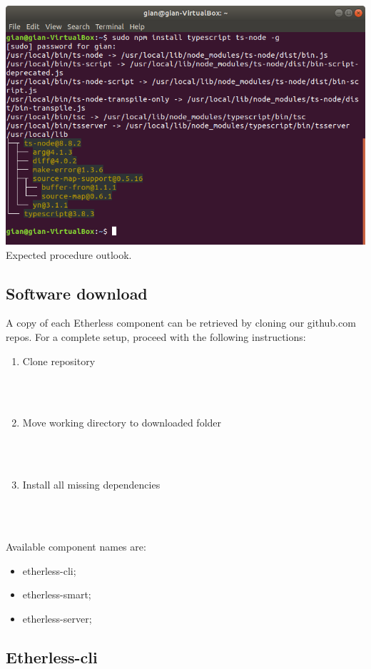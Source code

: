 \includegraphics[width=\textwidth]{res/img/typescriptInstall.png}    
Expected procedure outlook.
\subsection{Software download}
A copy of each Etherless component can be retrieved by cloning our github.com repos. For a complete setup, proceed with the following instructions:
\begin{enumerate}
	\item Clone repository \\\\\centerline{}\\
	\item Move working directory to downloaded folder \\\\\centerline{}\\
	\item Install all missing dependencies \\\\\centerline{}\\
\end{enumerate}
Available component names are:
\begin{itemize}
	\item etherless-cli;
	\item etherless-smart;
	\item etherless-server;
\end{itemize}
\subsection{Etherless-cli}
